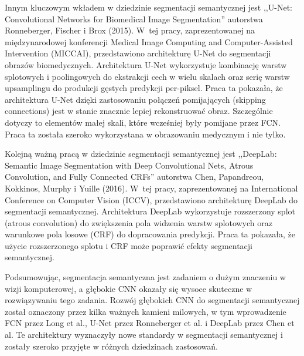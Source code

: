 Innym kluczowym wkładem w dziedzinie segmentacji semantycznej jest ,,U-Net: Convolutional Networks for Biomedical Image Segmentation'' autorstwa Ronneberger, Fischer i Brox (2015)\cite{ronneberger2015u}. W~tej pracy, zaprezentowanej na międzynarodowej konferencji Medical Image Computing and Computer-Assisted Intervention (MICCAI), przedstawiono architekturę U-Net do segmentacji obrazów biomedycznych. Architektura U-Net wykorzystuje kombinację warstw splotowych i poolingowych do ekstrakcji cech w wielu skalach oraz serię warstw upsamplingu do produkcji gęstych predykcji per-piksel. Praca ta pokazała, że architektura U-Net dzięki zastosowaniu połączeń pomijających (skipping connections) jest w stanie znacznie lepiej rekonstruować obraz. Szczególnie dotyczy to elementów małej skali, które wcześniej były pomijane przez FCN. Praca ta została szeroko wykorzystana w obrazowaniu medycznym i nie tylko.

Kolejną ważną pracą w dziedzinie segmentacji semantycznej jest ,,DeepLab: Semantic Image Segmentation with Deep Convolutional Nets, Atrous Convolution, and Fully Connected CRFs'' autorstwa Chen, Papandreou, Kokkinos, Murphy i Yuille (2016)\cite{deeplab}. W~tej pracy, zaprezentowanej na International Conference on Computer Vision (ICCV), przedstawiono architekturę DeepLab do segmentacji semantycznej. Architektura DeepLab wykorzystuje rozszerzony splot (atrous convolution) do zwiększenia pola widzenia warstw splotowych oraz warunkowe pola losowe (CRF) do dopracowania predykcji. Praca ta pokazała, że użycie rozszerzonego splotu i CRF może poprawić efekty segmentacji semantycznej.

Podsumowując, segmentacja semantyczna jest zadaniem o dużym znaczeniu w wizji komputerowej, a głębokie CNN okazały się wysoce skuteczne w rozwiązywaniu tego zadania. Rozwój głębokich CNN do segmentacji semantycznej został oznaczony przez kilka ważnych kamieni milowych, w tym wprowadzenie FCN przez Long et al., U-Net przez Ronneberger et al. i DeepLab przez Chen et al. Te architektury wyznaczyły nowe standardy w segmentacji semantycznej i zostały szeroko przyjęte w różnych dziedzinach zastosowań.




